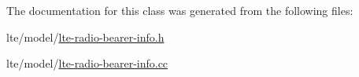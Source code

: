 The documentation for this class was generated from the following files\+:\begin{DoxyCompactItemize}
\item 
lte/model/\hyperlink{lte-radio-bearer-info_8h}{lte-\/radio-\/bearer-\/info.\+h}\item 
lte/model/\hyperlink{lte-radio-bearer-info_8cc}{lte-\/radio-\/bearer-\/info.\+cc}\end{DoxyCompactItemize}
